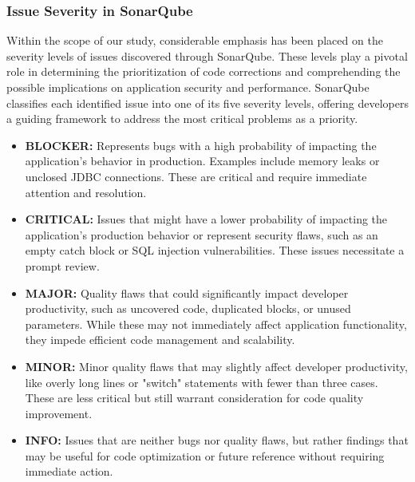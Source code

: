 \subsubsection{Issue Severity in SonarQube}
Within the scope of our study, considerable emphasis has been placed on the severity levels of issues discovered through SonarQube. These levels play a pivotal role in determining the prioritization of code corrections and comprehending the possible implications on application security and performance. SonarQube classifies each identified issue into one of its five severity levels, offering developers a guiding framework to address the most critical problems as a priority.
\begin{itemize}
    \item \textbf{BLOCKER:} Represents bugs with a high probability of impacting the application's behavior in production. Examples include memory leaks or unclosed JDBC connections. These are critical and require immediate attention and resolution.
    \item \textbf{CRITICAL:} Issues that might have a lower probability of impacting the application's production behavior or represent security flaws, such as an empty catch block or SQL injection vulnerabilities. These issues necessitate a prompt review.
    \item \textbf{MAJOR:} Quality flaws that could significantly impact developer productivity, such as uncovered code, duplicated blocks, or unused parameters. While these may not immediately affect application functionality, they impede efficient code management and scalability.
    \item \textbf{MINOR:} Minor quality flaws that may slightly affect developer productivity, like overly long lines or "switch" statements with fewer than three cases. These are less critical but still warrant consideration for code quality improvement.
    \item \textbf{INFO:} Issues that are neither bugs nor quality flaws, but rather findings that may be useful for code optimization or future reference without requiring immediate action.
\end{itemize}


